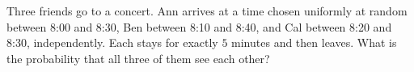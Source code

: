 Three friends go to a concert. Ann arrives at a time chosen uniformly at random between 8:00 and 8:30, Ben between 8:10 and 8:40, and Cal between 8:20 and 8:30, independently. Each stays for exactly $5$ minutes and then leaves. What is the probability that all three of them see each other?
